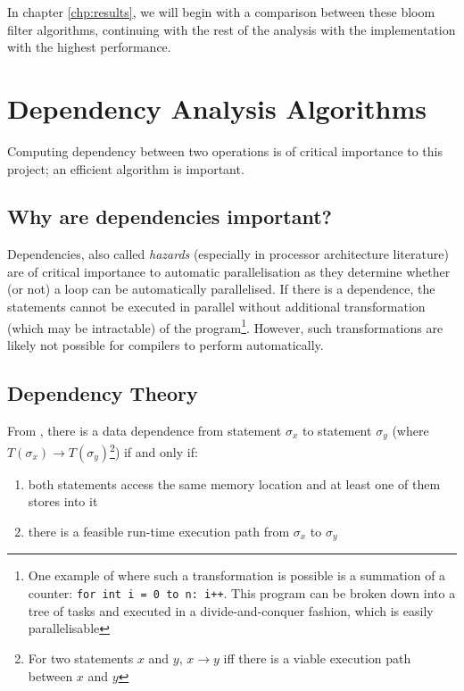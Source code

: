 	In chapter \ref{chp:results}, we will begin with a comparison between these bloom filter algorithms, continuing with the rest of the analysis with the implementation with the highest performance.

\section{Dependency Analysis Algorithms} \label{sec:runtime/analysis}
	Computing dependency between two operations is of critical importance to this project; an efficient algorithm is important.
	
	\subsection{Why are dependencies important?} \label{runtime/analysis/why}
	Dependencies, also called \textit{hazards} (especially in processor architecture literature) are of critical importance to automatic parallelisation as they determine whether (or not) a loop can be automatically parallelised. If there is a dependence, the statements cannot be executed in parallel without additional transformation (which may be intractable) of the program\footnote{One example of where such a transformation is possible is a summation of a counter: \texttt{for int i = 0 to n: i++}. This program can be broken down into a tree of tasks and executed in a divide-and-conquer fashion, which is easily parallelisable}. However, such transformations are likely not possible for compilers to perform automatically. 
	
	\subsection{Dependency Theory} \label{sec:runtime/analysis/theory}
	From \citet[p.~37]{Allen2000}, there is a data dependence from statement $\sigma_x$ to statement $\sigma_y$ (where $T(\sigma_x) \rightarrow T(\sigma_y)$\footnote{For two statements $x$ and $y$, $x \rightarrow y$ iff there is a viable execution path between $x$ and $y$}) if and only if:
	
	\begin{enumerate}
		\item both statements access the same memory location and at least one of them stores into it
		\item there is a feasible run-time execution path from $\sigma_x$ to $\sigma_y$
	\end{enumerate}
	
